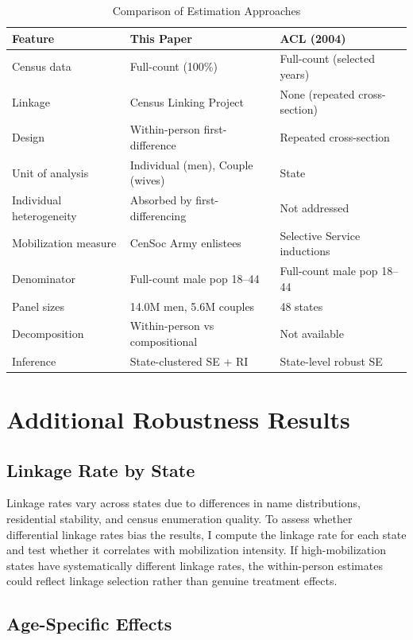 \documentclass[12pt]{article}
\begin{document}
\begin{table}[htbp]
\centering
\caption{Comparison of Estimation Approaches}
\label{tab:comparison}
\small
\begin{tabular}{p{4cm}p{5.5cm}p{5.5cm}}
\hline\hline
Feature & This Paper & ACL (2004) \\
\hline
Census data & Full-count (100\%) & Full-count (selected years) \\
Linkage & Census Linking Project \citep{abramitzky2025clp} & None (repeated cross-section) \\
Design & Within-person first-difference & Repeated cross-section \\
Unit of analysis & Individual (men), Couple (wives) & State \\
Individual heterogeneity & Absorbed by first-differencing & Not addressed \\
Mobilization measure & CenSoc Army enlistees & Selective Service inductions \\
Denominator & Full-count male pop 18--44 & Full-count male pop 18--44 \\
Panel sizes & 14.0M men, 5.6M couples & 48 states \\
Decomposition & Within-person vs compositional & Not available \\
Inference & State-clustered SE + RI & State-level robust SE \\
\hline\hline
\end{tabular}
\end{table}


\section{Additional Robustness Results}
\label{app:robustness}

\subsection{Linkage Rate by State}

Linkage rates vary across states due to differences in name distributions, residential stability, and census enumeration quality. To assess whether differential linkage rates bias the results, I compute the linkage rate for each state and test whether it correlates with mobilization intensity. If high-mobilization states have systematically different linkage rates, the within-person estimates could reflect linkage selection rather than genuine treatment effects.

\subsection{Age-Specific Effects}
\end{document}
